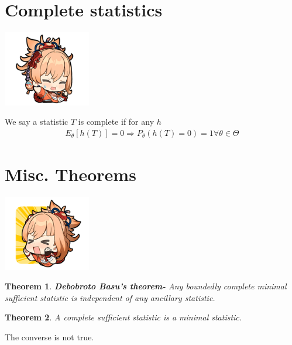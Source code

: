 \documentclass[oneside]{book}
\newtheorem{theorem}{Theorem}
\begin{document}
\section{Complete statistics}
\begin{marginfigure}%
    \includegraphics[width=1.5in]{chibis/file_023.png}
\end{marginfigure}%
We say a statistic $T$ is complete if for any $h$
\begin{align*}
    E_\theta\left[h(T)\right]=0\Rightarrow P_\theta(h(T)=0)=1\forall\theta\in\Theta
\end{align*}
\section{Misc. Theorems}
\begin{marginfigure}%
    \includegraphics[width=1.5in]{chibis/file_024.png}
\end{marginfigure}%
\begin{theorem}
    \textbf{Debobroto Basu's theorem- }Any boundedly complete minimal sufficient statistic is independent of any ancillary statistic.
\end{theorem}
\begin{theorem}
    A complete sufficient statistic is a minimal statistic.
\end{theorem}
The converse is not true.
\end{document}
